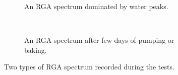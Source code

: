 \begin{figure}[!ht]
  \begin{subfigure}[t]{0.5\textwidth}
    
    \caption{An RGA spectrum dominated by water peaks.}
    \label{chap4:vacuum_rga_b}
  \end{subfigure}
  ~
  \begin{subfigure}[t]{0.5\textwidth}
    
    \caption{An RGA spectrum after few days of pumping or baking.}
    \label{chap4:vacuum_rga_a}
  \end{subfigure}
  \caption[Two types of RGA spectrum recorded during the tests]{Two types of RGA spectrum recorded during the tests.}
  \label{chap4:vacuum_rga}
\end{figure}
